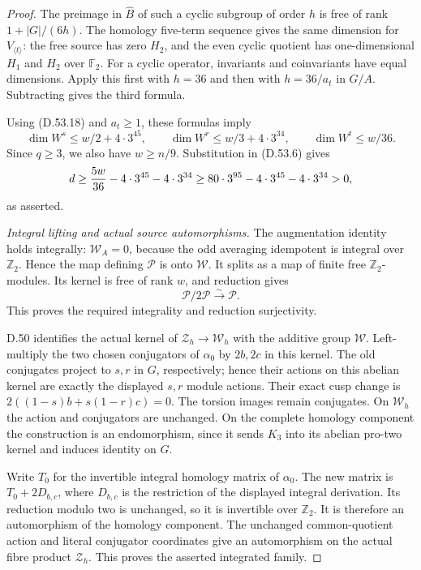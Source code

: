 \begin{proof}
The preimage in \(\widehat B\) of such
a cyclic subgroup of order \(h\) is
free of rank \(1+|G|/(6h)\).
The homology five-term sequence gives
the same dimension for \(V_{\langle t\rangle}\):
the free source has zero \(H_2\), and
the even cyclic quotient has one-dimensional
\(H_1\) and \(H_2\) over \(\mathbb F_2\).
For a cyclic operator, invariants and
coinvariants have equal dimensions.
Apply this first with \(h=36\) and then
with \(h=36/a_t\) in \(G/A\).
Subtracting gives the third formula.

Using (D.53.18) and \(a_t\ge1\), these formulas imply
\[
 \dim W^s\le w/2+4\cdot3^{45},\qquad
 \dim W^r\le w/3+4\cdot3^{34},\qquad
 \dim W^t\le w/36.
\]
Since \(q\ge3\), we also have \(w\ge n/9\).
Substitution in (D.53.6) gives
\[
 d\ge {5w\over36}-4\cdot3^{45}-4\cdot3^{34}
   \ge80\cdot3^{95}-4\cdot3^{45}-4\cdot3^{34}>0,
\]
as asserted.

\emph{Integral lifting and actual source automorphisms.}
The augmentation identity holds integrally:
\(\mathscr W_A=0\), because the odd
averaging idempotent is integral over
\(\mathbb Z_2\). Hence the map defining
\(\mathscr P\) is onto \(\mathscr W\).
It splits as a map of finite free
\(\mathbb Z_2\)-modules. Its kernel is
free of rank \(w\), and reduction gives
\[
                    \mathscr P/2\mathscr P
                          \xrightarrow{\sim}\mathcal P .
 \tag{D.53.20}
\]
This proves the required integrality
and reduction surjectivity.

D.50 identifies the actual kernel of
\(\mathcal Z_h\to\mathcal W_h\) with
the additive group \(\mathscr W\).
Left-multiply the two chosen conjugators
of \(\alpha_0\) by \(2b,2c\) in this
kernel. The old conjugates project to
\(s,r\) in \(G\), respectively; hence
their actions on this abelian kernel
are exactly the displayed \(s,r\)
module actions. Their exact cusp change is
\(2((1-s)b+s(1-r)c)=0\).
The torsion images remain conjugates.
On \(\mathcal W_h\) the action and
conjugators are unchanged. On the
complete homology component the
construction is an endomorphism,
since it sends \(K_3\) into its
abelian pro-two kernel and induces
identity on \(G\).

Write \(T_0\) for the invertible
integral homology matrix of \(\alpha_0\).
The new matrix is
\(T_0+2D_{b,c}\), where \(D_{b,c}\)
is the restriction of the displayed
integral derivation.
Its reduction modulo two is unchanged,
so it is invertible over \(\mathbb Z_2\).
It is therefore an automorphism of
the homology component. The unchanged
common-quotient action and literal
conjugator coordinates give an
automorphism on the actual fibre
product \(\mathcal Z_h\).
This proves the asserted integrated
family.


\end{proof}
